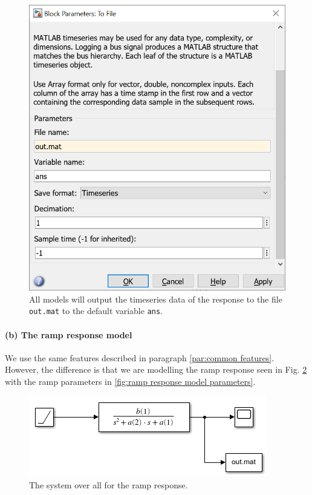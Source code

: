 \documentclass[12pt]{article}
\begin{document}
\begin{figure}[h]
    \centering
    \includegraphics[width=(5in/689)*688]{common_to_file.png}
    \caption{All models will output the timeseries data of the response to the file \texttt{out.mat} to the default variable \texttt{ans}.}
    \label{fig:common to file}
\end{figure}

\paragraph{(b) The ramp response model}

We use the same features described in paragraph \ref{par:common features}.
However, the difference is that we are modelling the ramp response seen in Fig. \ref{fig:ramp response model system}
with the ramp parameters in \ref{fig:ramp response model parameters}.

\begin{figure}[h]
    \centering
    \includegraphics[width=\linewidth]{part01b_ramp_response_model.png}
    \caption{The system over all for the ramp response.}
    \label{fig:ramp response model system}
\end{figure}
\end{document}

